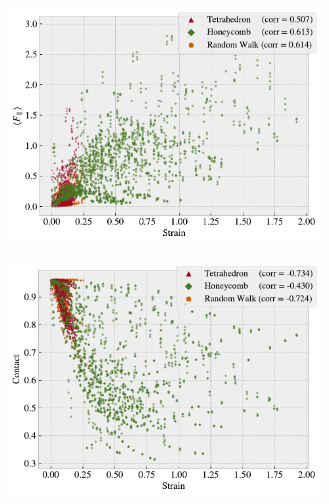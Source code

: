 \begin{figure}[!htb]
  \centering
  \begin{subfigure}[t]{0.49\textwidth}
      \centering
      \raggedleft
      \includegraphics[width=0.91\textwidth]{figures/ML/corr_stretch_Ff.pdf}
      \caption{}
  \end{subfigure}
  \hfill
  \begin{subfigure}[t]{0.49\textwidth}
      \centering
      \raggedright
      \includegraphics[width=0.91\textwidth]{figures/ML/corr_stretch_contact.pdf}
      \caption{}
  \end{subfigure}
  \hfill
  \begin{subfigure}[t]{0.49\textwidth}
      \centering
      \raggedleft

\end{subfigure}
\end{figure}
